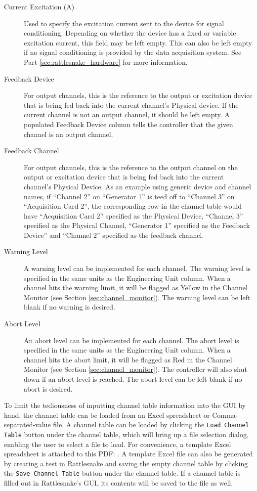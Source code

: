 \documentclass[pdf,12pt,report]{SANDreport}
\newcommand{\inlineCode}{\lstinline[basicstyle=\bfseries\ttfamily]}
\begin{document}
\begin{description}
        \item[Current Excitation (A)] Used to specify the excitation current sent to the device for signal conditioning.  Depending on whether the device has a fixed or variable excitation current, this field may be left empty.  This can also be left empty if no signal conditioning is provided by the data acquisition system.  See Part \ref{sec:rattlesnake_hardware} for more information.
        \item[Feedback Device] For output channels, this is the reference to the output or excitation device that is being fed back into the current channel's Physical device.  If the current channel is not an output channel, it should be left empty.  A populated Feedback Device column tells the controller that the given channel is an output channel.
        \item[Feedback Channel] For output channels, this is the reference to the output channel on the output or excitation device that is being fed back into the current channel's Physical Device.  As an example using generic device and channel names, if ``Channel 2'' on ``Generator 1'' is teed off to ``Channel 3'' on ``Acquisition Card 2'', the corresponding row in the channel table would have ``Acquisition Card 2'' specified as the Physical Device, ``Channel 3'' specified as the Physical Channel, ``Generator 1'' specified as the Feedback Device'' and ``Channel 2'' specified as the feedback channel.
        \item[Warning Level] A warning level can be implemented for each channel.  The warning level is specified in the same units as the Engineering Unit column.  When a channel hits the warning limit, it will be flagged as Yellow in the Channel Monitor (see Section \ref{sec:channel_monitor}).  The warning level can be left blank if no warning is desired.
        \item[Abort Level] An abort level can be implemented for each channel.  The abort level is specified in the same units as the Engineering Unit column.  When a channel hits the abort limit, it will be flagged as Red in the Channel Monitor (see Section \ref{sec:channel_monitor}).  The controller will also shut down if an abort level is reached.  The abort level can be left blank if no abort is desired.
    \end{description}

    To limit the tediousness of inputting channel table information into the \ac{GUI} by hand, the channel table can be loaded from an Excel spreadsheet or Comma-separated-value file.  A channel table can be loaded by clicking the \inlineCode{Load Channel Table} button under the channel table, which will bring up a file selection dialog, enabling the user to select a file to load.  For convenience, a template Excel spreadsheet is attached to this PDF: .  A template Excel file can also be generated by creating a test in Rattlesnake and saving the empty channel table by clicking the \inlineCode{Save Channel Table} button under the channel table.  If a channel table is filled out in Rattlesnake's \ac{GUI}, its contents will be saved to the file as well.
    
\end{document}
